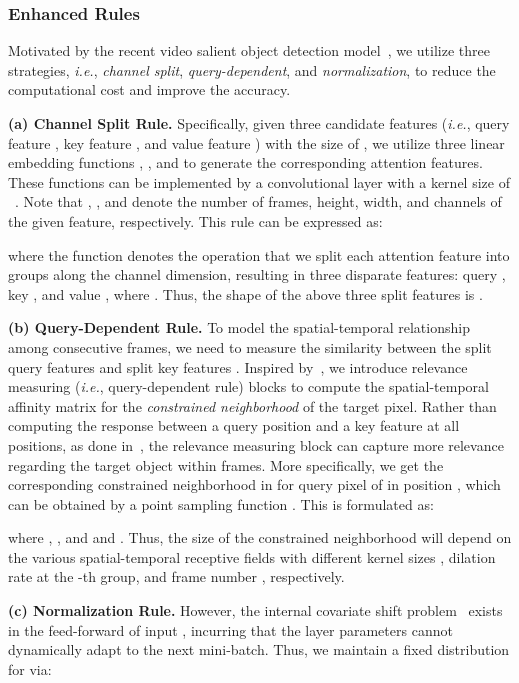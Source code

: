 \documentclass[default,iicol]{sn-jnl}
\theoremstyle{thmstyleone}
\theoremstyle{thmstyletwo}
\theoremstyle{thmstylethree}
\def\ie{\emph{i.e.}}
\begin{document}
\subsubsection{Enhanced Rules}
Motivated by the recent video salient object detection model~\cite{gu2020pyramid}, we utilize three strategies, \ie, \textit{channel split}, \textit{query-dependent}, and \textit{normalization}, to reduce the computational cost and improve the accuracy.

\noindent\textbf{(a) Channel Split Rule.}
Specifically, given three candidate features (\ie, query feature , key feature , and value feature ) with the size of , we utilize three linear embedding functions , , and  to generate the corresponding attention features.
These functions can be implemented by a convolutional layer with a kernel size of ~\cite{wang2018non}.
Note that , ,  and  denote the number of frames, height, width, and channels of the given feature, respectively.
This rule can be expressed as:

where the function  denotes the operation that we split each attention feature into  groups along the channel dimension, resulting in three disparate features: query , key , and value , where .
Thus, the shape of the above three split features is .

\noindent\textbf{(b) Query-Dependent Rule.}
To model the spatial-temporal relationship among consecutive frames, we need to measure the similarity between the split query features  and split key features .
Inspired by~\cite{gu2020pyramid}, we introduce  relevance measuring (\ie, query-dependent rule) blocks to compute the spatial-temporal affinity matrix for the \textit{constrained neighborhood} of the target pixel.
Rather than computing the response between a query position and a key feature at all positions, as done in~\cite{wang2018non}, the relevance measuring block can capture more relevance regarding the target object within  frames.
More specifically, we get the corresponding constrained neighborhood in  for query pixel  of  in position , which can be obtained by a point sampling function .
This is formulated as:

where , , and  and .
Thus, the size of the constrained neighborhood will depend on the various spatial-temporal receptive fields with different kernel sizes , dilation rate  at the -th group, and frame number , respectively.

\noindent\textbf{(c) Normalization Rule.}
However, the internal covariate shift problem~\cite{guo2020normalized} exists in the feed-forward of input , incurring that the layer parameters cannot dynamically adapt to the next mini-batch.
Thus, we maintain a fixed distribution for  via:
\end{document}
